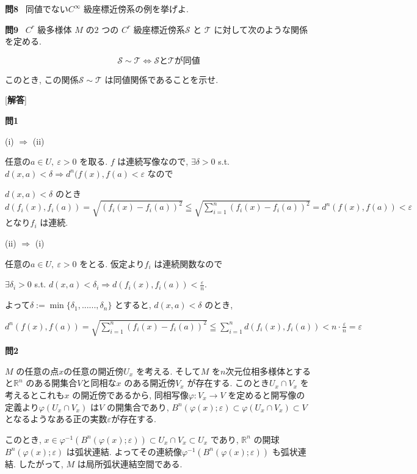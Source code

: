 \documentclass[dvipdfmx]{jsarticle}
\begin{document}
\bigskip

\textbf{問8} \ 
同値でない$C^{\infty}$ 級座標近傍系の例を挙げよ.

\bigskip

\textbf{問9} \ 
$C^r$ 級多様体 $M$ の$2$ つの $C^r$ 級座標近傍系$\mathcal{S}$ と $\mathcal{T}$ に対して次のような関係を定める.

$$
\mathcal{S} \sim \mathcal{T} \Longleftrightarrow
\mathcal{S} と \mathcal{T} が同値
$$

このとき, この関係$\mathcal{S} \sim \mathcal{T}$ は同値関係であることを示せ.


\bigskip
\bigskip

[\textbf{解答}]

\textbf{問1}

(i) $\Longrightarrow$ (ii)

任意の$a \in U, \ \varepsilon > 0$ を取る. $f$ は連続写像なので, $\exists \delta > 0$ s.t. $d(x,a) < \delta \Longrightarrow d^n(f(x),f(a) < \varepsilon$ なので 

$d(x,a) < \delta$ のとき
$d(f_i (x), f_i (a)) = \sqrt{(f_i (x) - f_i (a))^2} \leqq \sqrt{\displaystyle\sum_{i=1}^n (f_i (x) - f_i (a))^2} = d^n (f(x), f(a)) < \varepsilon$ となり$f_i$ は連続.

(ii) $\Longrightarrow$ (i)

任意の$a \in U, \ \varepsilon > 0$ をとる. 仮定より$f_i$ は連続関数なので 

$\exists \delta_i > 0$ s.t. $d(x,a) < \delta_i \Longrightarrow d(f_i (x), f_i (a)) < \displaystyle\frac{\varepsilon}{n}$. 

よって$\delta:= \min\{\delta_1, ......, \delta_n\}$ とすると, $d(x,a) < \delta$ のとき, 

$d^n (f(x), f(a)) = \sqrt{\displaystyle\sum_{i=1}^n (f_i (x)-f_i(a))^2} \leqq \displaystyle\sum_{i=1}^n d(f_i (x), f_i (a)) < n \cdot \frac{\varepsilon}{n} = \varepsilon$

\bigskip

\textbf{問2}

$M$ の任意の点$x$の任意の開近傍$U_x$ を考える. そして$M$ を$n$次元位相多様体とすると$\mathbb{R}^n$ のある開集合$V$と同相な$x$ のある開近傍$V_x$ が存在する. このとき$U_x \cap V_x$ を考えるとこれも$x$ の開近傍であるから, 同相写像$\varphi: V_x \to V$ を定めると開写像の定義より$\varphi(U_x \cap V_x)$ は$V$ の開集合であり, 
$B^n (\varphi(x) ; \varepsilon) \subset \varphi(U_x \cap V_x) \subset V$ となるようなある正の実数$\varepsilon$が存在する.

このとき, $x \in \varphi^{-1} (B^n(\varphi(x) ; \varepsilon)) \subset U_x \cap V_x \subset U_x$ であり, $\mathbb{R}^n$ の開球$B^n (\varphi(x) ; \varepsilon)$ は弧状連結. よってその連続像$\varphi^{-1} (B^n(\varphi(x) ; \varepsilon)) $ も弧状連結.
したがって, $M$ は局所弧状連結空間である.
\end{document}
